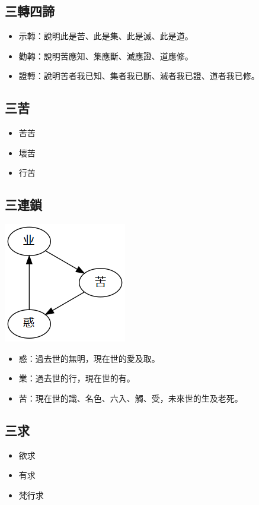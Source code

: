 \subsection{三轉四諦}
\begin{itemize}
  \item 示轉：說明此是苦、此是集、此是滅、此是道。
  \item 勸轉：說明苦應知、集應斷、滅應證、道應修。
  \item 證轉：說明苦者我已知、集者我已斷、滅者我已證、道者我已修。
\end{itemize}

\subsection{三苦}
\begin{itemize}
  \item 苦苦
  \item 壞苦
  \item 行苦
\end{itemize}

\subsection{三連鎖}
\includegraphics[scale=0.5]{释家/images/三连锁.png}
\begin{itemize}
  \item 惑：過去世的無明，現在世的愛及取。
  \item 業：過去世的行，現在世的有。
  \item 苦：現在世的識、名色、六入、觸、受，未來世的生及老死。
\end{itemize}



\subsection{三求}
\begin{itemize}
  \item 欲求  \item 有求  \item 梵行求
\end{itemize}
